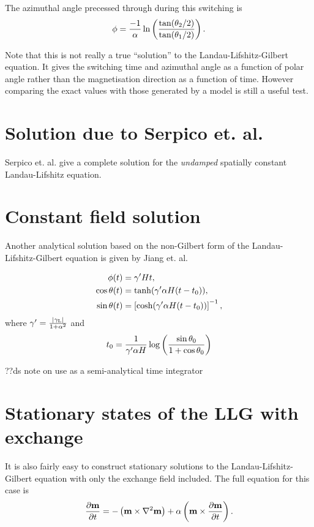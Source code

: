 The azimuthal angle precessed through during this switching is
\begin{equation}
  \phi = \frac{-1}{\alpha} \ln \left( \frac{\tan(\theta_2/2)}{\tan(\theta_1/2)} \right).
\end{equation}

Note that this is not really a true ``solution'' to the Landau-Lifshitz-Gilbert equation.
It gives the switching time and azimuthal angle as a function of polar angle rather than the magnetisation direction as a function of time. However comparing the exact values with those generated by a model is still a useful test.

\section{Solution due to Serpico et. al.}

Serpico et. al. \cite{Serpico2003} give a complete solution for the \emph{undamped} spatially constant Landau-Lifshitz equation.




\section{Constant field solution}

Another analytical solution based on the non-Gilbert form of the Landau-Lifshitz-Gilbert equation is given by Jiang et. al.\cite{Jiang2001}

\begin{align*}
  \phi(t) &= \gamma' H t, \\
  \cos \theta(t) &= \tanh (\gamma' \alpha H (t - t_0)), \\
  \sin \theta(t) &= \left[ \cosh (\gamma' \alpha H (t - t_0)) \right]^{-1}, \\
\end{align*}
where $\gamma' = \frac{{\lvert \gamma_{\text{\tiny{L}}} \rvert}}{1 + \alpha^2}$ and
\begin{equation}
  t_0 = \frac{1}{\gamma' \alpha H} \log \left( \frac{\sin \theta_0}{1 + \cos \theta_0} \right)
\end{equation}


??ds note on use as a semi-analytical time integrator

\section{Stationary states of the LLG with exchange}

It is also fairly easy to construct stationary solutions to the Landau-Lifshitz-Gilbert equation with only the exchange field included.
The full equation for this case is
\begin{equation}
  \frac{\partial \mathbf{m}}{\partial t} = - \left( \mathbf{m} \times \nabla^2 \mathbf{m} \right) + \alpha \left( \mathbf{m} \times \frac{\partial \mathbf{m}}{\partial t} \right).
\end{equation}

